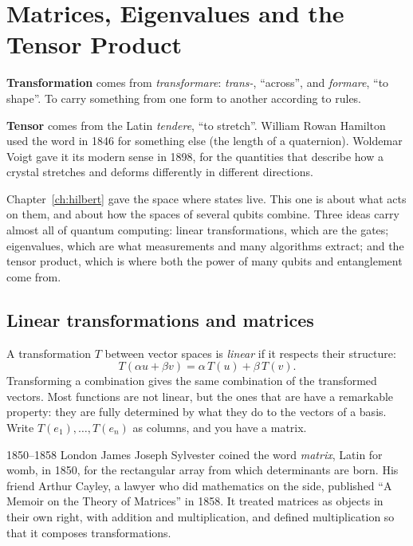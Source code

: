 \chapter{Matrices, Eigenvalues and the Tensor Product}\label{ch:linear}

\begin{etymology}
\textbf{Transformation} comes from \emph{transformare}: \emph{trans-},
``across'', and \emph{formare}, ``to shape''. To carry something from one form
to another according to rules.

\textbf{Tensor} comes from the Latin \emph{tendere}, ``to stretch''. William
Rowan Hamilton used the word in 1846 for something else (the length of a
quaternion). Woldemar Voigt gave it its modern sense in 1898, for the quantities
that describe how a crystal stretches and deforms differently in different
directions.
\end{etymology}

Chapter~\ref{ch:hilbert} gave the space where states live. This one is about what
acts on them, and about how the spaces of several qubits combine. Three ideas carry
almost all of quantum computing: linear transformations, which are the gates;
eigenvalues, which are what measurements and many algorithms extract; and the
tensor product, which is where both the power of many qubits and entanglement
come from.

\section{Linear transformations and matrices}

A transformation $T$ between vector spaces is \emph{linear} if it respects their
structure:
\[
  T(\alpha u + \beta v) = \alpha\,T(u) + \beta\,T(v).
\]
Transforming a combination gives the same combination of the transformed
vectors. Most functions are not linear, but the ones that are have a remarkable
property: they are fully determined by what they do to the vectors of a basis.
Write $T(e_1), \dots, T(e_n)$ as columns, and you have a matrix.

\begin{history}{1850--1858 \textperiodcentered{} London}
James Joseph Sylvester coined the word \emph{matrix}, Latin for womb, in 1850,
for the rectangular array from which determinants are born. His friend Arthur
Cayley, a lawyer who did mathematics on the side, published ``A Memoir on the
Theory of Matrices'' in 1858. It treated matrices as objects in their own right,
with addition and multiplication, and defined multiplication so that it composes
transformations.
\end{history}

